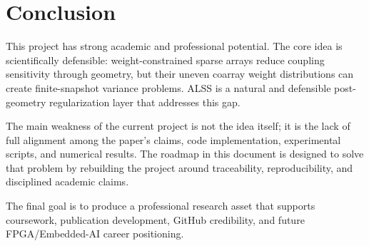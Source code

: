 \documentclass[11pt,letterpaper]{article}
\newcommand{\ALSS}{\textsc{ALSS}}
\begin{document}
\section{Conclusion}

This project has strong academic and professional potential. The core idea is scientifically defensible: weight-constrained sparse arrays reduce coupling sensitivity through geometry, but their uneven coarray weight distributions can create finite-snapshot variance problems. \ALSS{} is a natural and defensible post-geometry regularization layer that addresses this gap.

The main weakness of the current project is not the idea itself; it is the lack of full alignment among the paper's claims, code implementation, experimental scripts, and numerical results. The roadmap in this document is designed to solve that problem by rebuilding the project around traceability, reproducibility, and disciplined academic claims.

The final goal is to produce a professional research asset that supports coursework, publication development, GitHub credibility, and future FPGA/Embedded-AI career positioning.
\end{document}
